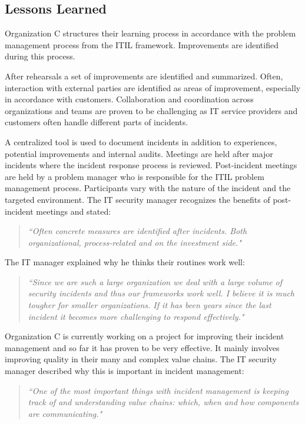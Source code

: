 \subsection{Lessons Learned}
Organization C structures their learning process in accordance with the problem management process from the ITIL framework. Improvements are identified during this process. 

After rehearsals a set of improvements are identified and summarized. Often, interaction with external parties are identified as areas of improvement, especially in accordance with customers. Collaboration and coordination across organizations and teams are proven to be challenging as IT service providers and customers often handle different parts of incidents. 

A centralized tool is used to document incidents in addition to experiences, potential improvements and internal audits. Meetings are held after major incidents where the incident response process is reviewed. Post-incident meetings are held by a problem manager who is responsible for the ITIL problem management process. Participants vary with the nature of the incident and the targeted environment. The IT security manager recognizes the benefits of post-incident meetings and stated:

\begin{quote}
\textit{``Often concrete measures are identified after incidents. Both organizational, process-related and on the investment side."}
\end{quote}

The IT manager explained why he thinks their routines work well:

\begin{quote}
\textit{``Since we are such a large organization we deal with a large volume of security incidents and thus our frameworks work well. I believe it is much tougher for smaller organizations. If it has been years since the last incident it becomes more challenging to respond effectively."}
\end{quote}

Organization C is currently working on a project for improving their incident management and so far it has proven to be very effective. It mainly involves improving quality in their many and complex value chains. The IT security manager described why this is important in incident management:

\begin{quote}
\textit{``One of the most important things with incident management is keeping track of and understanding value chains: which, when and how components are communicating."}
\end{quote}

